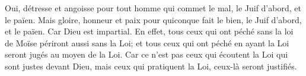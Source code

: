 Oui, détresse et angoisse pour tout homme qui commet le mal,
	le Juif d’abord, et le païen.
Mais gloire, honneur et paix pour quiconque fait le bien,
	le Juif d’abord, et le païen.
Car Dieu est impartial.
En effet, tous ceux qui ont péché sans la loi de Moïse
		périront aussi sans la Loi;
	et tous ceux qui ont péché en ayant la Loi seront jugés au moyen de la Loi.
Car ce n’est pas ceux qui écoutent la Loi qui sont justes devant Dieu,
	mais ceux qui pratiquent la Loi, ceux-là seront justifiés.
